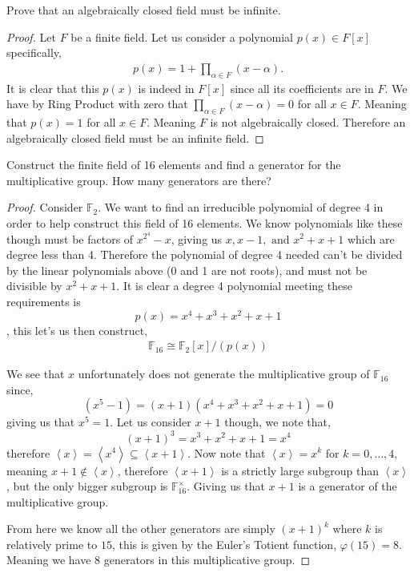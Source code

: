 \documentclass[11pt]{article}
\newenvironment{problem}[2][Problem\!]{\begin{tcolorbox}\begin{trivlist}
\item[\hskip \labelsep {\bfseries #1}\hskip \labelsep {\bfseries #2}]}{\end{trivlist}\end{tcolorbox}}
\newcommand{\ff}{\mathbb F}   %
\renewcommand{\phi}{\varphi}
\newcommand{\lrw}[1]{\left<#1\right>}
\begin{document}
\vspace*{15pt}

\begin{problem}{14.3.3}
    Prove that an algebraically closed field must be infinite. 
\end{problem}
\begin{proof}
    Let $F$ be a finite field. Let us consider a polynomial $p(x) \in F[x]$ specifically,
    \begin{align*}
        p(x) = 1 + \prod_{\alpha \in F}(x - \alpha). 
    \end{align*}
    It is clear that this $p(x)$ is indeed in $F[x]$ since all its coefficients are in $F$. 
    We have by Ring Product with zero that $\prod_{\alpha \in F}(x -\alpha) = 0$ for all $x \in F$. Meaning that $p(x) = 1$ for all $x \in F$. Meaning $F$ is not algebraically closed. Therefore an algebraically closed field must be an infinite field. 

\end{proof}

\vspace*{15pt}

\begin{problem}{14.3.4}
    Construct the finite field of 16 elements and find a generator for the multiplicative group. How many generators are there?
\end{problem}
\begin{proof}
    Consider $\ff_2$. We want to find an irreducible polynomial of degree 4 in order to help construct this field of 16 elements. We know polynomials like these though must be factors of $x^{2^{4}} - x$, giving us $x, x-1, \text{ and } x^{2} + x + 1$ which are degree less than 4. Therefore the polynomial of degree 4 needed can't be divided by the linear polynomials above (0 and 1 are not roots), and must not be divisible by $x^{2} + x + 1$. It is clear a degree 4 polynomial meeting these requirements is \[p(x) = x^{4} + x^{3} + x^{2}+ x + 1\], this let's us then construct,
    \begin{align*}
        \ff_{16} \cong \ff_2[x]/(p(x))
    \end{align*}

    We see that $x$ unfortunately does not generate the multiplicative group of $\ff_{16}$ since,
    \[(x^{5} - 1) = (x+1)(x^{4} + x^{3} + x^{2} + x + 1) = 0\] giving us that $x^{5} = 1$. Let us consider $x+1$ though, we note that,
    \[(x+1)^{3} = x^{3} + x^{2}+ x + 1 = x^{4}\]
    therefore $\lrw{x} =\lrw{x^{4}} \subseteq \lrw{x + 1}$. Now note that $\lrw{x} = x^{k}$ for $k = 0,\dots, 4$, meaning $x+1 \notin \lrw{x}$, therefore $\lrw{x+1}$ is a strictly large subgroup than $\lrw{x}$, but the only bigger subgroup is $\ff_{16}^{\times}$. Giving us that $x+1$ is a generator of the multiplicative group. 

    From here we know all the other generators are simply $(x+1)^{k}$ where $k$ is relatively prime to $15$, this is given by the Euler's Totient function, $\phi(15) = 8$. Meaning we have $8$ generators in this multiplicative group. 
\end{proof}
\end{document}
